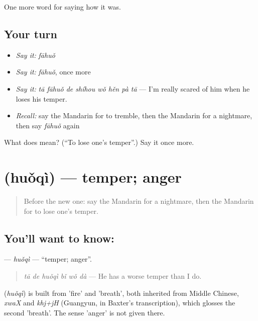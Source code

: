 \begin{grammarlens}[title={What you've built}]
One more word for saying how it was.
\end{grammarlens}

\subsection*{Your turn}
\begin{itemize}
\raggedright
  \item \emph{Say it:} \emph{fāhuǒ}
  \item \emph{Say it:} \emph{fāhuǒ}, once more
  \item \emph{Say it:} \emph{tā fāhuǒ de shíhou wǒ hěn pà tā} — I'm really scared of him when he loses his temper.
  \item \emph{Recall:} say the Mandarin for to tremble, then the Mandarin for a nightmare, then say \emph{fāhuǒ} again
\end{itemize}

\begin{tcolorbox}[breakable,colback=teal!4,colframe=teal!35!black,title={Before you move on}]
What does  mean? (\textquotedblleft{}To lose one's temper\textquotedblright{}.) Say it once more.
\end{tcolorbox}
\section[\texorpdfstring{\zh{火气} (huǒqì)}{火气 (huǒqì)}]{ (huǒqì) — temper; anger}

\label{lesson:ZH-C464-huoqi}



\begin{quote}
Before the new one: say the Mandarin for a nightmare, then the Mandarin for to lose one's temper.
\end{quote}

\subsection*{You'll want to know: }
\textbf{} — \emph{huǒqì} — \textquotedblleft{}temper; anger\textquotedblright{}.

\begin{quote}
\textbf{} \emph{tā de huǒqì bǐ wǒ dà} — He has a worse temper than I do.
\end{quote}

\begin{cousinweb}
\textbf{} (\emph{huǒqì}) is built from  'fire' and  'breath', both inherited from Middle Chinese, \emph{xwaX} and \emph{khj+jH} (Guangyun, in Baxter's transcription), which glosses the second 'breath'. The sense 'anger' is not given there.
\end{cousinweb}

